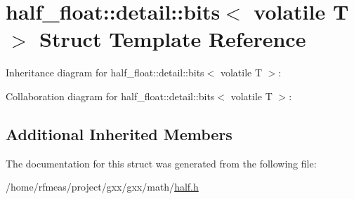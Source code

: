 \hypertarget{structhalf__float_1_1detail_1_1bits_3_01volatile_01T_01_4}{}\section{half\+\_\+float\+:\+:detail\+:\+:bits$<$ volatile T $>$ Struct Template Reference}
\label{structhalf__float_1_1detail_1_1bits_3_01volatile_01T_01_4}


Inheritance diagram for half\+\_\+float\+:\+:detail\+:\+:bits$<$ volatile T $>$\+:


Collaboration diagram for half\+\_\+float\+:\+:detail\+:\+:bits$<$ volatile T $>$\+:
\subsection*{Additional Inherited Members}


The documentation for this struct was generated from the following file\+:\begin{DoxyCompactItemize}
\item 
/home/rfmeas/project/gxx/gxx/math/\hyperlink{half_8h}{half.\+h}\end{DoxyCompactItemize}
